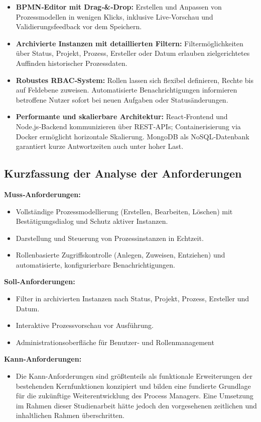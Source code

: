 \begin{itemize}
  \item \textbf{BPMN‑Editor mit Drag‑\&‑Drop:} Erstellen und Anpassen von Prozessmodellen in wenigen Klicks, inklusive Live‑Vorschau und Validierungsfeedback vor dem Speichern.
  \item \textbf{Archivierte Instanzen mit detaillierten Filtern:} Filtermöglichkeiten über Status, Projekt, Prozess, Ersteller oder Datum erlauben zielgerichtetes Auffinden historischer Prozessdaten.
  \item \textbf{Robustes RBAC‑System:} Rollen lassen sich flexibel definieren, Rechte bis auf Feldebene zuweisen. Automatisierte Benachrichtigungen informieren betroffene Nutzer sofort bei neuen Aufgaben oder Statusänderungen.
  \item \textbf{Performante und skalierbare Architektur:} React‑Frontend und Node.js‑Backend kommunizieren über REST‑APIs; Containerisierung via Docker ermöglicht horizontale Skalierung. MongoDB als NoSQL‑Datenbank garantiert kurze Antwortzeiten auch unter hoher Last.
\end{itemize}

\newpage
\subsection*{Kurzfassung der Analyse der Anforderungen}
\textbf{Muss‑Anforderungen:}
\begin{itemize}
  \item Vollständige Prozessmodellierung (Erstellen, Bearbeiten, Löschen) mit Bestätigungsdialog und Schutz aktiver Instanzen.
  \item Darstellung und Steuerung von Prozessinstanzen in Echtzeit.
  \item Rollenbasierte Zugriffskontrolle (Anlegen, Zuweisen, Entziehen) und automatisierte, konfigurierbare Benachrichtigungen.
\end{itemize}

\textbf{Soll‑Anforderungen:}
\begin{itemize}
  \item Filter in archivierten Instanzen nach Status, Projekt, Prozess, Ersteller und Datum.
  \item Interaktive Prozessvorschau vor Ausführung.
  \item Administrationsoberfläche für Benutzer‑ und Rollenmanagement
\end{itemize}

\textbf{Kann‑Anforderungen:}
\begin{itemize}
  \item Die Kann-Anforderungen sind größtenteils als funktionale Erweiterungen der bestehenden Kernfunktionen konzipiert und bilden eine fundierte Grundlage für die zukünftige Weiterentwicklung des Process Managers. Eine Umsetzung im Rahmen dieser Studienarbeit hätte jedoch den vorgesehenen zeitlichen und inhaltlichen Rahmen überschritten.
\end{itemize}

